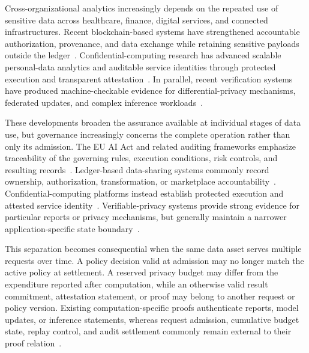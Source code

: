 \documentclass[10pt,journal,compsoc]{IEEEtran}
\begin{document}
\maketitle

\IEEEdisplaynontitleabstractindextext
\IEEEpeerreviewmaketitle


Cross-organizational analytics increasingly depends on the repeated use of sensitive data across healthcare, finance, digital services, and connected infrastructures. Recent blockchain-based systems have strengthened accountable authorization, provenance, and data exchange while retaining sensitive payloads outside the ledger~\cite{hoang2024promark,sun2022verifiable}. Confidential-computing research has advanced scalable personal-data analytics and auditable service identities through protected execution and transparent attestation~\cite{de2025covault,delignat2025transparent}. In parallel, recent verification systems have produced machine-checkable evidence for differential-privacy mechanisms, federated updates, and complex inference workloads~\cite{zhang2025robust,qu2025zkgpt,zhou2025vprivkv}.

These developments broaden the assurance available at individual stages of data use, but governance increasingly concerns the complete operation rather than only its admission. The EU AI Act and related auditing frameworks emphasize traceability of the governing rules, execution conditions, risk controls, and resulting records~\cite{euaiact2024,mokander2022conformity}. Ledger-based data-sharing systems commonly record ownership, authorization, transformation, or marketplace accountability~\cite{sun2022verifiable,hoang2024promark}. Confidential-computing platforms instead establish protected execution and attested service identity~\cite{brossard2023private,de2025covault}. Verifiable-privacy systems provide strong evidence for particular reports or privacy mechanisms, but generally maintain a narrower application-specific state boundary~\cite{bontekoe2024efficient,zhou2025vprivkv}.

This separation becomes consequential when the same data asset serves multiple requests over time. A policy decision valid at admission may no longer match the active policy at settlement. A reserved privacy budget may differ from the expenditure reported after computation, while an otherwise valid result commitment, attestation statement, or proof may belong to another request or policy version. Existing computation-specific proofs authenticate reports, model updates, or inference statements, whereas request admission, cumulative budget state, replay control, and audit settlement commonly remain external to their proof relation~\cite{wei2025verifiable,bellachia2025verifbfl,qu2025zkgpt}.
\end{document}
